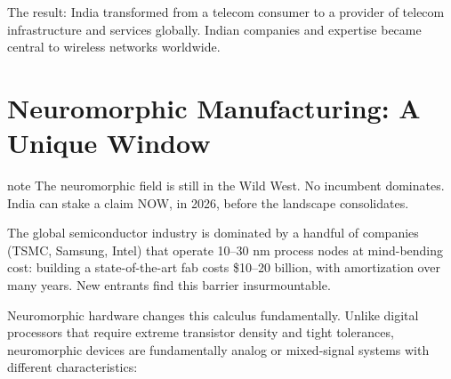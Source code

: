 The result: India transformed from a telecom consumer to a provider of telecom infrastructure and services globally. Indian companies and expertise became central to wireless networks worldwide.

\section{Neuromorphic Manufacturing: A Unique Window}
\begin{block}{note}
The neuromorphic field is still in the Wild West. No incumbent dominates. India can stake a claim NOW, in 2026, before the landscape consolidates.
\end{block}


The global semiconductor industry is dominated by a handful of companies (TSMC, Samsung, Intel) that operate 10--30 nm process nodes at mind-bending cost: building a state-of-the-art fab costs \$10--20 billion, with amortization over many years. New entrants find this barrier insurmountable.

Neuromorphic hardware changes this calculus fundamentally. Unlike digital processors that require extreme transistor density and tight tolerances, neuromorphic devices are fundamentally analog or mixed-signal systems with different characteristics:

